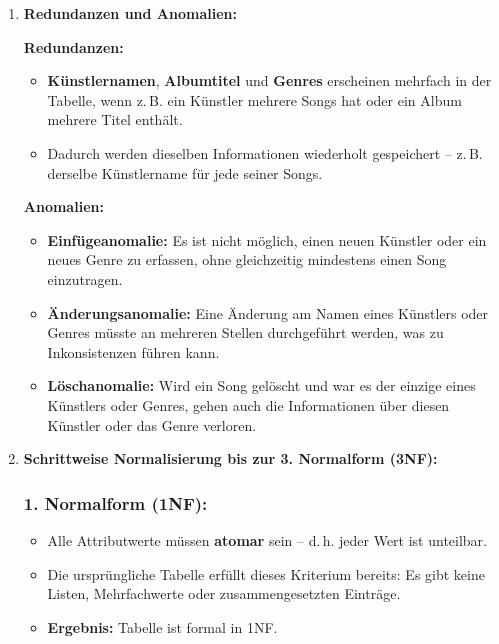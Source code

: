 \documentclass[a4paper,12pt]{article}
\begin{document}
	\begin{enumerate}
		\item \textbf{Redundanzen und Anomalien:}
		
		\textbf{Redundanzen:}
		\begin{itemize}
			\item \textbf{Künstlernamen}, \textbf{Albumtitel} und \textbf{Genres} erscheinen mehrfach in der Tabelle, wenn z.\,B. ein Künstler mehrere Songs hat oder ein Album mehrere Titel enthält.
			\item Dadurch werden dieselben Informationen wiederholt gespeichert – z.\,B. derselbe Künstlername für jede seiner Songs.
		\end{itemize}
		
		\textbf{Anomalien:}
		\begin{itemize}
			\item \textbf{Einfügeanomalie:} Es ist nicht möglich, einen neuen Künstler oder ein neues Genre zu erfassen, ohne gleichzeitig mindestens einen Song einzutragen.
			\item \textbf{Änderungsanomalie:} Eine Änderung am Namen eines Künstlers oder Genres müsste an mehreren Stellen durchgeführt werden, was zu Inkonsistenzen führen kann.
			\item \textbf{Löschanomalie:} Wird ein Song gelöscht und war es der einzige eines Künstlers oder Genres, gehen auch die Informationen über diesen Künstler oder das Genre verloren.
		\end{itemize}
		
		\vspace{1em}
		
		\item \textbf{Schrittweise Normalisierung bis zur 3. Normalform (3NF):}
		
		\subsubsection*{1. Normalform (1NF):}
		\begin{itemize}
			\item Alle Attributwerte müssen \textbf{atomar} sein – d.\,h. jeder Wert ist unteilbar.
			\item Die ursprüngliche Tabelle erfüllt dieses Kriterium bereits: Es gibt keine Listen, Mehrfachwerte oder zusammengesetzten Einträge.
			\item \textbf{Ergebnis:} Tabelle ist formal in 1NF.
		\end{itemize}
		
		\vspace{0.5em}
		

\end{enumerate}
\end{document}
